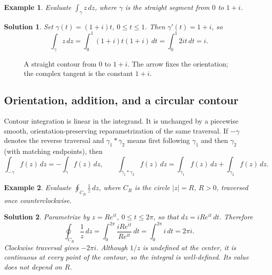 \documentclass{report}
\newtheorem{example}{Example}
\newtheorem{solution}{Solution}
\begin{document}
\begin{example}
    Evaluate $\displaystyle\int_\gamma z\,dz$, where $\gamma$ is the
    straight segment from $0$ to $1+i$.
\end{example}
\begin{solution}
    Set $\gamma(t)=(1+i)t$, $0\leq t\leq1$. Then
    $\gamma'(t)=1+i$, so
    \[
        \int_\gamma z\,dz
        =\int_0^1 (1+i)t(1+i)\,dt
        =\int_0^1 2it\,dt=i.
    \]
\end{solution}

\begin{figure}[H]
    \centering
    \caption{A straight contour from $0$ to $1+i$. The arrow fixes the
    orientation; the complex tangent is the constant $1+i$.}
    \label{fig:integration-segment}
\end{figure}

\subsection{Orientation, addition, and a circular contour}

Contour integration is linear in the integrand. It is unchanged by a
piecewise smooth, orientation-preserving reparametrization of the same
traversal. If $-\gamma$ denotes the reverse traversal and
$\gamma_1*\gamma_2$ means first following $\gamma_1$ and then $\gamma_2$
(with matching endpoints), then
\[
    \int_{-\gamma} f(z)\,dz=-\int_\gamma f(z)\,dz,
    \qquad
    \int_{\gamma_1*\gamma_2}f(z)\,dz
    =\int_{\gamma_1}f(z)\,dz+\int_{\gamma_2}f(z)\,dz.
\]

\begin{example}
    Evaluate $\displaystyle\oint_{C_R}\frac{1}{z}\,dz$, where
    $C_R$ is the circle $|z|=R$, $R>0$, traversed once counterclockwise.
\end{example}
\begin{solution}
    Parametrize by $z=Re^{it}$, $0\leq t\leq2\pi$, so that
    $dz=iRe^{it}\,dt$. Therefore
    \[
        \oint_{C_R}\frac{1}{z}\,dz
        =\int_0^{2\pi}\frac{iRe^{it}}{Re^{it}}\,dt
        =\int_0^{2\pi}i\,dt=2\pi i.
    \]
    Clockwise traversal gives $-2\pi i$. Although $1/z$ is undefined at
    the center, it is continuous at every point of the contour, so the
    integral is well-defined. Its value does not depend on $R$.
\end{solution}
\end{document}
